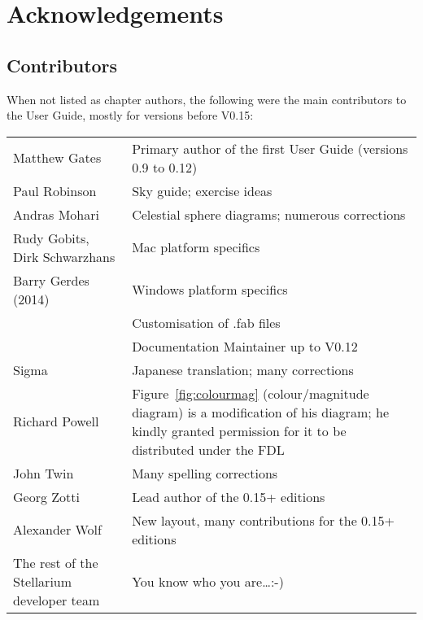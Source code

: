 \chapter{Acknowledgements}

\section{Contributors}
\label{sec:Contributors}
When not listed as chapter authors, the following were the main contributors to the User Guide, mostly for versions before V0.15:

\noindent%
\begin{tabularx}{\textwidth}{l|X}
\toprule
Matthew Gates  & Primary author of the first User Guide (versions 0.9 to 0.12)\\
Paul Robinson  &Sky guide; exercise ideas\\
Andras Mohari  &Celestial sphere diagrams; numerous corrections\\
Rudy Gobits, Dirk Schwarzhans & Mac platform specifics\\
Barry Gerdes (\textdagger{}2014)  &Windows platform specifics \\
               &Customisation of .fab files\\
               &Documentation Maintainer up to V0.12\\
Sigma          &Japanese translation; many corrections\\ %
Richard Powell & Figure~\ref{fig:colourmag} (colour/magnitude diagram) is a modification of his diagram; 
                 he kindly granted permission for it to be distributed under the FDL\\
John Twin      & Many spelling corrections \\\midrule
Georg Zotti    & Lead author of the 0.15+ editions\\
Alexander Wolf & New layout, many contributions for the 0.15+ editions\\
The rest of the Stellarium developer team & You know who you are\ldots :-)\tabularnewline
\bottomrule
\end{tabularx}


